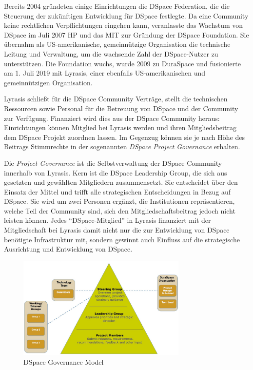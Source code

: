\documentclass[a4paper,
fontsize=11pt,
oneside,
numbers=noperiodatend,
parskip=half-,
bibliography=totoc,
final
]{scrartcl}
\begin{document}
Bereits 2004 gründeten einige Einrichtungen die DSpace Federation, die
die Steuerung der zukünftigen Entwicklung für DSpace festlegte. Da eine
Community keine rechtlichen Verpflichtungen eingehen kann, veranlasste
das Wachstum von DSpace im Juli 2007 HP und das MIT zur Gründung der
DSpace Foundation. Sie übernahm als US-amerikanische, gemeinnützige
Organisation die technische Leitung und Verwaltung, um die wachsende
Zahl der DSpace-Nutzer zu unterstützen. Die Foundation wuchs, wurde 2009
zu DuraSpace und fusionierte am 1. Juli 2019 mit Lyrasis, einer
ebenfalls US-amerikanischen und gemeinnützigen Organisation.

Lyrasis schließt für die DSpace Community Verträge, stellt die
technischen Ressourcen sowie Personal für die Betreuung von DSpace und
der Community zur Verfügung. Finanziert wird dies aus der DSpace
Community heraus: Einrichtungen können Mitglied bei Lyrasis werden und
ihren Mitgliedsbeitrag dem DSpace Projekt zuordnen lassen. Im Gegenzug
können sie je nach Höhe des Beitrags Stimmrechte in der sogenannten
\emph{DSpace Project Governance} erhalten.

Die \emph{Project Governance} ist die Selbstverwaltung der DSpace
Community innerhalb von Lyrasis. Kern ist die DSpace Leadership Group,
die sich aus gesetzten und gewählten Mitgliedern zusammensetzt. Sie
entscheidet über den Einsatz der Mittel und trifft alle strategischen
Entscheidungen in Bezug auf DSpace. Sie wird um zwei Personen ergänzt,
die Institutionen repräsentieren, welche Teil der Community sind, sich
den Mitgliedschaftsbeitrag jedoch nicht leisten können. Jedes
\enquote{DSpace-Mitglied} in Lyrasis finanziert mit der Mitgliedschaft
bei Lyrasis damit nicht nur die zur Entwicklung von DSpace benötigte
Infrastruktur mit, sondern gewinnt auch Einfluss auf die strategische
Ausrichtung und Entwicklung von DSpace.

\begin{figure}
\centering
\includegraphics[width=0.75\textwidth]{img/DSpace_Project_Governance.png}
\caption{DSpace Governance Model}
\end{figure}
\end{document}
